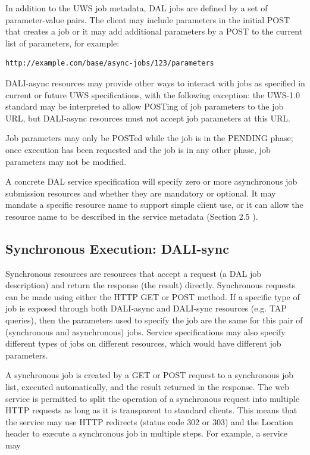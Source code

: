 \documentclass[11pt,letter]{ivoa}
\begin{document}
In addition to the UWS job metadata, DAL jobs are defined by a set of 
parameter-value pairs. The client may include parameters in the initial POST 
that creates a job or it may add additional parameters by a POST to the current 
list of parameters, for example:

\begin{verbatim}
http://example.com/base/async-jobs/123/parameters
\end{verbatim}

DALI-async resources may provide other ways to interact with jobs as specified 
in current or future UWS specifications, with the following exception: the 
UWS-1.0 standard may be interpreted to allow POSTing of job parameters to the 
job URL, but DALI-async resources must not accept job parameters at this URL.

Job parameters may only be POSTed while the job is in the PENDING phase; once 
execution has been requested and the job is in any other phase, job parameters 
may not be modified.

A concrete DAL service specification will specify zero or more asynchronous job 
submission resources and whether they are mandatory or optional. It may mandate 
a specific resource name to support simple client use, or it can allow the 
resource name to be described in the service metadata (Section 2.5 ).

\subsection{Synchronous Execution: DALI-sync}
\label{sec:dali-sync}
Synchronous resources are resources that accept a request (a DAL job 
description) and return the response (the result) directly. Synchronous requests 
can be made using either the HTTP GET or POST method. If a specific type of job 
is exposed through both DALI-async and DALI-sync resources (e.g. TAP queries), 
then the parameters used to specify the job are the same for  this pair of 
(synchronous and asynchronous) jobs. Service specifications may also specify 
different types of jobs on different resources, which would have different job 
parameters.

A synchronous job is created by a GET or POST request to a synchronous job list, 
executed automatically, and the result returned in the response. The web service 
is permitted to split the operation of a synchronous request into multiple HTTP 
requests as long as it is transparent to standard clients. This means that the 
service may use HTTP redirects (status code 302 or 303) and the Location header 
to execute a synchronous job in multiple steps. For example, a service may
\end{document}
